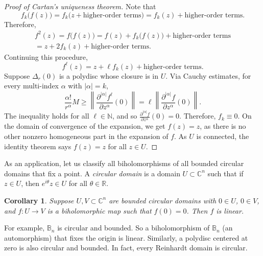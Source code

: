 \documentclass[12pt,openany]{book}
\newcommand{\sabs}[1]{\lvert {#1} \rvert}
\newcommand{\norm}[1]{\left\lVert {#1} \right\rVert}
\newcommand{\C}{{\mathbb{C}}}
\newcommand{\R}{{\mathbb{R}}}
\newcommand{\N}{{\mathbb{N}}}
\newcommand{\bB}{{\mathbb{B}}}
\newcommand{\myindex}[1]{#1\index{#1}}
\theoremstyle{plain}
\newtheorem{cor}[thm]{Corollary}
\theoremstyle{remark}
\theoremstyle{definition}
\theoremstyle{exercise}
\theoremstyle{example}
\begin{document}
\begin{proof}[Proof of Cartan's uniqueness theorem]
Note that
\begin{equation*}
f_k\bigl(f(z)\bigr)
=
f_k\bigl(z + \text{higher-order terms}\bigr)
=
f_k(z) + \text{higher-order terms}.
\end{equation*}
Therefore,
\begin{multline*}
f^2(z) =
f\bigl(f(z)\bigr) =
f(z) + f_k\bigl(f(z)\bigr) + \text{higher-order terms}
\\
=
z + 2 f_k(z) + \text{higher-order terms}.
\end{multline*}
Continuing this procedure,
\begin{equation*}
f^\ell(z) = z + \ell f_k(z) + \text{higher-order terms}.
\end{equation*}
Suppose $\Delta_r(0)$ is a polydisc whose
closure is in $U$.
Via Cauchy estimates,
for every multi-index $\alpha$ with $\sabs{\alpha}=k$,
\begin{equation*}
\frac{\alpha!}{r^\alpha} M
\geq
\norm{\frac{\partial^{\sabs{\alpha}} f^\ell}{\partial z^\alpha}(0)}
=
\ell
\norm{\frac{\partial^{\sabs{\alpha}} f}{\partial z^\alpha}(0)} .
\end{equation*}
The inequality holds for all $\ell \in \N$, and so
$\frac{\partial^{\sabs{\alpha}} f}{\partial z^\alpha}(0) = 0$.  Therefore,
$f_k \equiv 0$.  On the domain of convergence of the expansion,
we get $f(z) = z$, as there is no other
nonzero homogeneous part in the expansion of $f$.  As $U$ is connected,
the identity theorem says $f(z) = z$ for all $z \in U$.
\end{proof}

As an application, let us classify all biholomorphisms of all bounded
circular domains that fix a point.
A \emph{\myindex{circular domain}} is a domain
$U \subset \C^n$ such that if $z \in U$, then $e^{i\theta} z \in U$ for
all $\theta \in \R$.

\begin{cor}
Suppose $U, V \subset \C^n$ are bounded circular domains with $0 \in U$, $0 \in
V$, and $f \colon U \to V$ is
a biholomorphic map such that $f(0) = 0$.  Then $f$ is linear.
\end{cor}

For example, $\bB_n$ is circular and bounded.  So a biholomorphism of $\bB_n$
(an automorphism)
that fixes the origin is linear.  Similarly, a polydisc centered at zero is
also circular and bounded.  In fact, every Reinhardt domain is circular.
\end{document}
